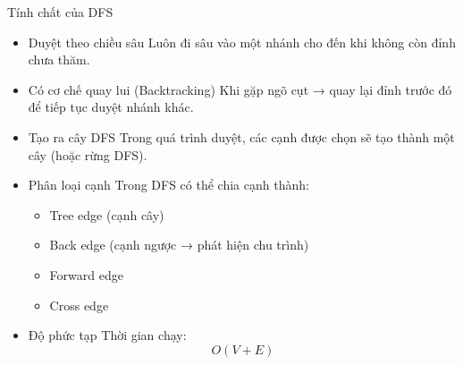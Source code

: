 \documentclass{beamer}
\newcommand{\hlblue}[1]{\textcolor{myblue}{#1}}
\newcommand{\hlgreen}[1]{\textcolor{mygreen}{#1}}
\newcommand{\hlred}[1]{\textcolor{myred}{#1}}
\newcommand{\hlpurple}[1]{\textcolor{mypurple}{#1}}
\newcommand{\hlorange}[1]{\textcolor{myorange}{#1}}
\begin{document}
\begin{frame}{Tính chất của DFS}

\begin{itemize}

\item \hlblue{Duyệt theo chiều sâu}  
Luôn đi sâu vào một nhánh cho đến khi không còn đỉnh chưa thăm.

\vspace{5pt}

\item \hlgreen{Có cơ chế quay lui (Backtracking)}  
Khi gặp ngõ cụt → quay lại đỉnh trước đó để tiếp tục duyệt nhánh khác.

\vspace{5pt}

\item \hlpurple{Tạo ra cây DFS}  
Trong quá trình duyệt, các cạnh được chọn sẽ tạo thành một cây (hoặc rừng DFS).

\vspace{5pt}

\item \hlorange{Phân loại cạnh}  
Trong DFS có thể chia cạnh thành:
\begin{itemize}
\item Tree edge (cạnh cây)
\item Back edge (cạnh ngược → phát hiện chu trình)
\item Forward edge
\item Cross edge
\end{itemize}

\vspace{5pt}

\item \hlred{Độ phức tạp}  
Thời gian chạy: 
\[
O(V + E)
\]

\end{itemize}

\end{frame}
\end{document}
